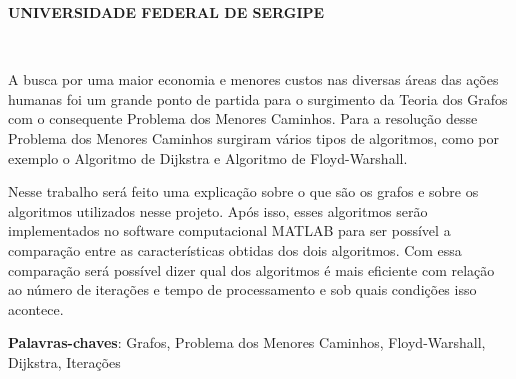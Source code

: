 \documentclass[
12pt,				%
openright,			%
oneside,			%
a4paper,			%
english,			%
french,				%
spanish,			%
brazil,				%
]{abntex2}
\renewcommand{\imprimircapa}{%
	\begin{capa}%
		\center
		\ABNTEXchapterfont\Large \textbf{UNIVERSIDADE FEDERAL DE SERGIPE}
		\\
		\vspace*{1cm}
		{\ABNTEXchapterfont\large\imprimirautor}
		\vfill
		\begin{center}
			\ABNTEXchapterfont\bfseries\LARGE\imprimirtitulo
		\end{center}
		\vfill
		\large\imprimirlocal \\
		\large\imprimirdata
		\vspace*{1cm}
	\end{capa}
}
\begin{document}
	\lstset{language=Matlab} 
	
	\frenchspacing 
	
	
	\imprimircapa
	
	\imprimirfolhaderosto*
	
	
	
	\setlength{\absparsep}{18pt} %
	\begin{resumo}
		
		A busca por uma maior economia e menores custos nas diversas áreas das ações humanas foi um grande ponto de partida para o surgimento da Teoria dos Grafos com o consequente Problema dos Menores Caminhos. Para a resolução desse Problema dos Menores Caminhos surgiram vários tipos de algoritmos, como por exemplo o Algoritmo de Dijkstra e Algoritmo de Floyd-Warshall.
		
		 Nesse trabalho será feito uma explicação sobre o que são os grafos e sobre os algoritmos utilizados nesse projeto. Após isso, esses algoritmos serão implementados no software computacional MATLAB para ser possível a comparação entre as características obtidas dos dois algoritmos. Com essa comparação será possível dizer qual dos algoritmos é mais eficiente com relação ao número de iterações e tempo de processamento e sob quais condições isso acontece.
		
		\noindent
		\textbf{Palavras-chaves}: Grafos, Problema dos Menores Caminhos, Floyd-Warshall, Dijkstra, Iterações
	\end{resumo}
	
	\listoffigures*
	\pagebreak
	
	\listoftables*
	\pagebreak
	
	
	
	\tableofcontents*
	\pagebreak
	
\end{document}
